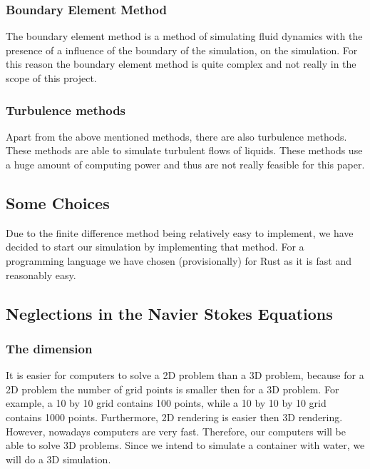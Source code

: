 \documentclass{article}
\begin{document}
\subsubsection{Boundary Element Method}
The boundary element method is a method of simulating fluid dynamics with the presence of a influence of the boundary of the simulation, on the simulation. For this reason the boundary element method is quite complex and not really in the scope of this project. \cite{Boundary Element Method}
\subsubsection{Turbulence methods}
Apart from the above mentioned methods, there are also turbulence methods. These methods are able to simulate turbulent flows of liquids. These methods use a huge amount of computing power and thus are not really feasible for this paper.
\subsection{Some Choices}
Due to the finite difference method being relatively easy to implement, we have decided to start our simulation by implementing that method. For a programming language we have chosen (provisionally) for Rust as it is fast and reasonably easy.

\subsection{Neglections in the Navier Stokes Equations}
\subsubsection{The dimension}
It is easier for computers to solve a 2D problem than a 3D problem, because for a 2D problem the number of grid points is smaller then for a 3D problem. For example, a 10 by 10 grid contains 100 points, while a 10 by 10 by 10 grid contains 1000 points. Furthermore, 2D rendering is easier then 3D rendering. However, nowadays computers are very fast. Therefore, our computers will be able to solve 3D problems. Since we intend to simulate a container with water, we will do a 3D simulation.
\end{document}
